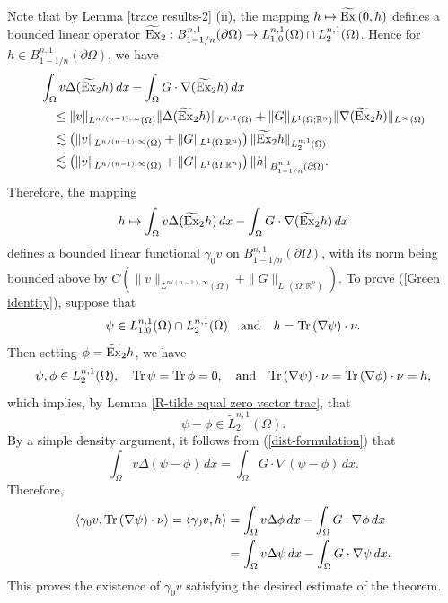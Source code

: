 \documentclass[reqno,centertags,11pt]{amsart}
\theoremstyle{definition}
\numberwithin{thm}{section}
\numberwithin{equation}{section}
\newcommand{\R}{{\mathbb{R}}}
\begin{document}
Note   that by Lemma \ref{trace results-2} (ii), the mapping $h\mapsto \widetilde{\rm  Ex}\, (0,h) $ defines a bounded linear operator $\widetilde{\rm  Ex}_2 : B_{1-1/n}^{n,1}(\partial\Omega )\rightarrow L_{1,0}^{n,1}(\Omega )\cap L_2^{n,1}(\Omega)$. Hence for  $h \in B_{1-1/n}^{n,1}(\partial\Omega ) $, we have
\begin{align*}
&\int_\Omega v \Delta (\widetilde{\rm  Ex}_2 h) \, dx - \int_\Omega G \cdot \nabla (\widetilde{\rm  Ex}_2 h) \, d x \\
&\quad \le \|v\|_{L^{n/(n-1),\infty}(\Omega )} \|\Delta (\widetilde{\rm  Ex}_2 h)\|_{L^{n,1}(\Omega )}+\|G\|_{ L^1 (\Omega ; \R^n)}\|\nabla (\widetilde{\rm  Ex}_2 h)\|_{L^\infty(\Omega )}\\
&\quad \lesssim  \left( \|v\|_{L^{n/(n-1),\infty}(\Omega )} +\|G\|_{ L^1 (\Omega; \R^n )} \right) \|\widetilde{\rm  Ex}_2 h\|_{L_2^{n,1}(\Omega )}\\
&\quad \lesssim  \left( \|v\|_{L^{n/(n-1),\infty}(\Omega )} +\|G\|_{ L^1 (\Omega; \R^n )} \right) \|  h\|_{B_{1-1/n}^{n,1}(\partial\Omega )}.
\end{align*}
Therefore, the  mapping
\[
h \mapsto \int_\Omega v \Delta (\widetilde{\rm  Ex}_2 h) \, dx - \int_\Omega G \cdot \nabla (\widetilde{\rm  Ex}_2 h) \, d x
\]
defines a bounded linear functional $\gamma_0 v$ on $B_{1-1/n}^{n,1}(\partial\Omega )$,  with its  norm being bounded above by $C \left( \|v\|_{L^{n/(n-1),\infty}(\Omega )}+ \|G\|_{ L^1 (\Omega ;\R^n )} \right)$. To prove (\ref{Green identity}), suppose that
$$
\psi \in L_{1,0}^{n,1}(\Omega )\cap L_2^{n,1}(\Omega) \quad\mbox{and}\quad h= {\rm Tr}\, (\nabla \psi) \cdot \nu.
$$
Then setting $\phi =\widetilde{\rm  Ex}_2 h$, we have
\[
\psi , \phi \in L_2^{n,1}(\Omega), \quad {\rm Tr} \, \psi ={\rm Tr} \, \phi =0, \quad  \mbox{and}\quad  {\rm Tr}\, (\nabla \psi) \cdot \nu = {\rm Tr}\, (\nabla \phi ) \cdot \nu =h ,
\]
which implies,  by Lemma \ref{R-tilde equal zero vector trac}, that
\[
\psi -\phi \in  \widetilde{L}_2^{n,1} (\Omega ).
\]
By a simple density argument, it follows from (\ref{dist-formulation}) that
\[
\int_\Omega v \Delta (\psi -\phi ) \, dx = \int_\Omega G \cdot \nabla (\psi-\phi) \, d x .
\]
Therefore,
\begin{align*}
\left\langle \gamma_0 v , {\rm Tr}\, (\nabla \psi) \cdot \nu \right\rangle   =
\left\langle \gamma_0 v , h \right\rangle
&=\int_\Omega v \Delta \phi \, dx - \int_\Omega G \cdot \nabla \phi \, d x\\
&=\int_\Omega v \Delta \psi \, dx - \int_\Omega G \cdot \nabla \psi \, d x
.
\end{align*}
This proves the existence of $\gamma_0 v$ satisfying the desired  estimate of the theorem.
\end{document}
